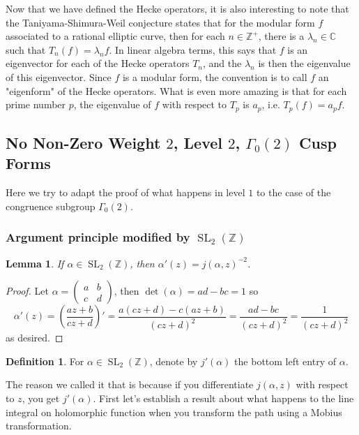 \documentclass{article}
\newtheorem{lemma}[theorem]{Lemma}
\theoremstyle{definition}
\newtheorem{definition}{Definition}[section]
\theoremstyle{definition}
\theoremstyle{definition}
\newcommand{\SLZ}{\operatorname{SL}_2(\mathbb{Z})}
\newcommand{\SL}{\operatorname{SL}}
\newcommand{\Z}{\mathbb{Z}}
\newcommand{\Mabcd}{\begin{pmatrix} a&b\\c&d \end{pmatrix}}
\begin{document}
\newline\newline
Now that we have defined the Hecke operators, it is also interesting to note that the Taniyama-Shimura-Weil conjecture states that for the modular form $f$ associated to a rational elliptic curve, then for each $n\in\mathbb Z^+$, there is a $\lambda_n\in\mathbb C$ such that $T_n(f)=\lambda_n f$. In linear algebra terms, this says that $f$ is an eigenvector for each of the Hecke operators $T_n$, and the $\lambda_n$ is then the eigenvalue of this eigenvector. Since $f$ is a modular form, the convention is to call $f$ an "eigenform" of the Hecke operators. What is even more amazing is that for each prime number $p$, the eigenvalue of $f$ with respect to $T_p$ is $a_p$, i.e. $T_p(f)=a_pf$.





\subsection{No Non-Zero Weight $2$, Level $2$, $\Gamma_0(2)$ Cusp Forms}
Here we try to adapt the proof of what happens in level $1$ to the case of the congruence subgroup $\Gamma_0(2)$. 


\subsubsection{Argument principle modified by $\SL_2(\Z)$}
\begin{lemma}
    If $\alpha\in\SLZ$, then $\alpha'(z)=j(\alpha,z)^{-2}$.
\end{lemma}
\begin{proof}
    Let $\alpha=\Mabcd$, then $\det(\alpha)=ad-bc=1$ so
    $$\alpha'(z)=\left(\frac{az+b}{cz+d}\right)'=\frac{a(cz+d)-c(az+b)}{(cz+d)^2}=\frac{ad-bc}{(cz+d)^2}=\frac 1{(cz+d)^2}$$
    as desired.
\end{proof}

\begin{definition}
    For $\alpha\in\SLZ$, denote by $j'(\alpha)$ the bottom left entry of $\alpha$.
\end{definition}
The reason we called it that is because if you differentiate $j(\alpha,z)$ with respect to $z$, you get $j'(\alpha)$.
\newline\newline
First let's establish a result about what happens to the line integral on holomorphic function when you transform the path using a Mobius transformation.
\end{document}
